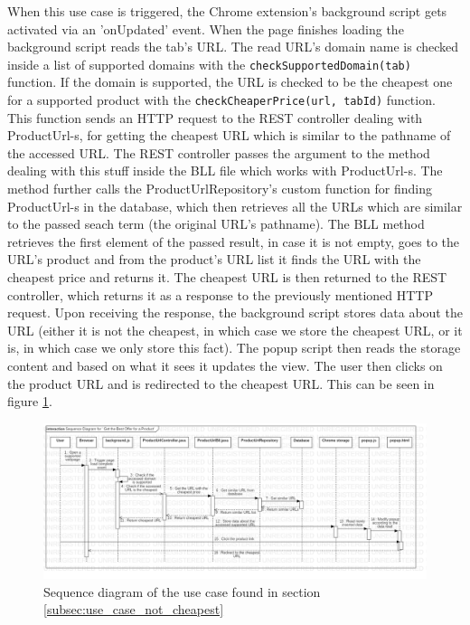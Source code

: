 \documentclass[12pt,a4paper,twoside]{report}
\begin{document}
When this use case is triggered, the Chrome extension's background script gets activated via an 'onUpdated' event. When the page finishes loading the background script reads the tab's URL. The read URL's domain name is checked inside a list of supported domains with the \lstinline$checkSupportedDomain(tab)$ function. If the domain is supported, the URL is checked to be the cheapest one for a supported product with the \lstinline$checkCheaperPrice(url, tabId)$ function. This function sends an HTTP request to the REST controller dealing with ProductUrl-s, for getting the cheapest URL which is similar to the pathname of the accessed URL. The REST controller passes the argument to the method dealing with this stuff inside the BLL file which works with ProductUrl-s. The method further calls the ProductUrlRepository's custom function for finding ProductUrl-s in the database, which then retrieves all the URLs which are similar to the passed seach term (the original URL's pathname). The BLL method retrieves the first element of the passed result, in case it is not empty, goes to the URL's product and from the product's URL list it finds the URL with the cheapest price and returns it. The cheapest URL is then returned to the REST controller, which returns it as a response to the previously mentioned HTTP request. Upon receiving the response, the background script stores data about the URL (either it is not the cheapest, in which case we store the cheapest URL, or it is, in which case we only store this fact). The popup script then reads the storage content and based on what it sees it updates the view. The user then clicks on the product URL and is redirected to the cheapest URL. This can be seen in figure \ref{fig:sequence_not_cheapest_offer}.

\begin{figure}[ht]
  \centering
  \includegraphics[width=\linewidth]{img/sequence_not_cheapest_offer.png}
  \caption{Sequence diagram of the use case found in section \ref{subsec:use_case_not_cheapest}}
  \label{fig:sequence_not_cheapest_offer}
\end{figure}
\end{document}
